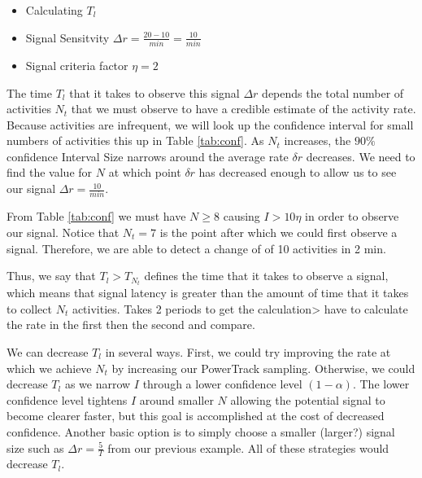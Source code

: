 \documentclass{article}
\begin{document}
\begin{itemize}
\item Calculating $T_{l}$
\item Signal Sensitvity $\Delta r = \frac{20-10}{min} = \frac{10}{min}$
\item Signal criteria factor $\eta=2$
\end{itemize}

The time $T_{l}$ that it takes to observe this signal $\Delta r$ depends the total number of activities $N_t$ that we must observe to have a credible estimate of the activity rate. Because activities are infrequent, we will look up the confidence interval for small numbers of activities this up in Table \ref{tab:conf}.  As $N_t$ increases, the $90\%$ confidence Interval Size narrows around the average rate $\delta r$ decreases.  We need to find the value for $N$ at which point $\delta r$ has decreased enough to allow us to see our signal $\Delta r = \frac{10}{min}$.  

From Table \ref{tab:conf} we must have $N\geq8$ causing $I > 10\eta$ in order to observe our signal.  Notice that $N_t=7$ is the point after which we could first observe a signal. Therefore, we are able to detect a change of of 10 activities in 2 min.


 Thus, we say that $T_{l}>T_{N_t}$ defines the time that it takes to observe a signal, which means that signal latency is greater than the amount of time that it takes to collect $N_t$ activities.  Takes 2 periods to get the calculation> have to calculate the rate in the first then the second and compare.

We can decrease $T_{l}$ in several ways.  First, we could try improving the rate at which we achieve $N_t$ by  increasing our PowerTrack sampling.  Otherwise, we could decrease $T_{l}$ as we narrow $I$ through a lower confidence level $(1-\alpha)$.  The lower confidence level tightens $I$ around smaller $N$ allowing the potential signal to become clearer faster, but this goal is accomplished at the cost of decreased confidence.  Another basic option is to simply choose a smaller (larger?) signal size such as $\Delta r = \frac{5}{T}$ from our previous example.  All of these strategies would decrease $T_{l}$.
\end{document}
